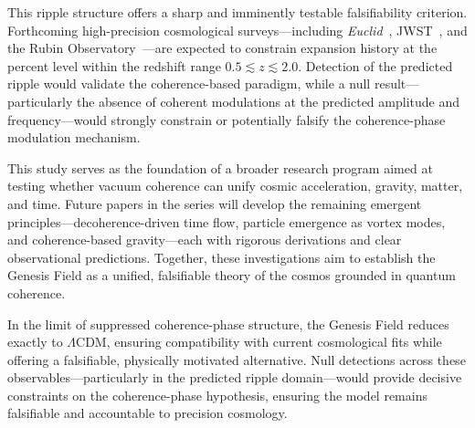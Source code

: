This ripple structure offers a sharp and imminently testable falsifiability criterion. Forthcoming high-precision cosmological surveys—including \textit{Euclid}~\cite{Laureijs2011}, JWST~\cite{Gardner2006}, and the Rubin Observatory~\cite{LSST2009}—are expected to constrain expansion history at the percent level within the redshift range \(0.5 \lesssim z \lesssim 2.0\). Detection of the predicted ripple would validate the coherence-based paradigm, while a null result—particularly the absence of coherent modulations at the predicted amplitude and frequency—would strongly constrain or potentially falsify the coherence-phase modulation mechanism.

This study serves as the foundation of a broader research program aimed at testing whether vacuum coherence can unify cosmic acceleration, gravity, matter, and time. Future papers in the series will develop the remaining emergent principles—decoherence-driven time flow, particle emergence as vortex modes, and coherence-based gravity—each with rigorous derivations and clear observational predictions. Together, these investigations aim to establish the Genesis Field as a unified, falsifiable theory of the cosmos grounded in quantum coherence.

In the limit of suppressed coherence-phase structure, the Genesis Field reduces exactly to \(\Lambda\)CDM, ensuring compatibility with current cosmological fits while offering a falsifiable, physically motivated alternative. Null detections across these observables—particularly in the predicted ripple domain—would provide decisive constraints on the coherence-phase hypothesis, ensuring the model remains falsifiable and accountable to precision cosmology.
